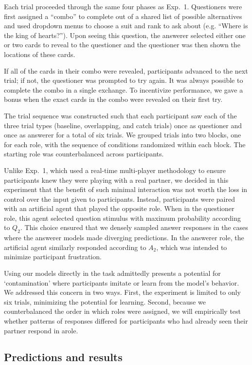 \documentclass[11pt, floatsintext]{apa6}
\begin{document}
Each trial proceeded through the same four phases as Exp.~1. 
Questioners were first assigned a ``combo'' to complete out of a shared list of possible alternatives and used dropdown menus to choose a suit and rank to ask about (e.g. ``Where is the king of hearts?'').
Upon seeing this question, the answerer selected either one or two cards to reveal to the questioner and the questioner was then shown the locations of these cards.

If all of the cards in their combo were revealed, participants advanced to the next trial; if not, the questioner was prompted to try again.
It was always possible to complete the combo in a single exchange.
To incentivize performance, we gave a bonus when the exact cards in the combo were revealed on their first try. 

The trial sequence was constructed such that each participant saw each of the three trial types (baseline, overlapping, and catch trials) once as questioner and once as answerer for a total of six trials.
We grouped trials into two blocks, one for each role, with the sequence of conditions randomized within each block.
The starting role was counterbalanced across participants.

Unlike Exp.~1, which used a real-time multi-player methodology to ensure participants knew they were playing with a real partner, we decided in this experiment that the benefit of such minimal interaction was not worth the loss in control over the input given to participants.
Instead, participants were paired with an artificial agent that played the opposite role.
When in the questioner role, this agent selected question stimulus with maximum probability according to $Q_2$. 
This choice ensured that we densely sampled answer responses in the cases where the answerer models made diverging predictions.
In the answerer role, the artificial agent similarly responded according to $A_2$, which was intended to minimize participant frustration.

Using our models directly in the task admittedly presents a potential for `contamination' where participants imitate or learn from the model's behavior. 
We addressed this concern in two ways. 
First, the experiment is limited to only six trials, minimizing the potential for learning.
Second, because we counterbalanced the order in which roles were assigned, we will empirically test whether patterns of responses differed for participants who had already seen their partner respond in arole.

\subsection{Predictions and results}
\end{document}
